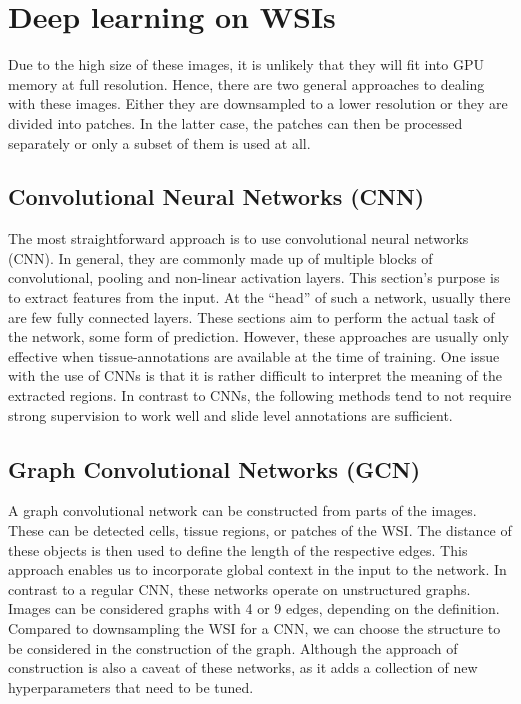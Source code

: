\section{Deep learning on WSIs}

Due to the high size of these images, it is unlikely that they will fit into GPU memory at full resolution. Hence, there are two general approaches to dealing with these images. 
Either they are downsampled to a lower resolution or they are divided into patches. In the latter case, the patches can then be processed separately or only a subset of them is used at all.

\subsection{Convolutional Neural Networks (CNN)}

The most straightforward approach is to use convolutional neural networks (CNN). In general, they are commonly made up of multiple blocks of convolutional, pooling and non-linear activation layers. This section's purpose is to extract features from the input. At the “head” of such a network, usually there are few fully connected layers. These sections aim to perform the actual task of the network, some form of prediction. However, these approaches are usually only effective when tissue-annotations are available at the time of training. One issue with the use of CNNs is that it is rather difficult to interpret the meaning of the extracted regions. \cite{Lipkova2022Artificial}
In contrast to CNNs, the following methods tend to not require strong supervision to work well and slide level annotations are sufficient. 

\subsection{Graph Convolutional Networks (GCN)}

A graph convolutional network can be constructed from parts of the images. These can be detected cells, tissue regions, or patches of the WSI. The distance of these objects is then used to define the length of the respective edges. \cite{Chen2022Pathomic, AhmedtAristizabal2022survey, Chen2021Whole}
This approach enables us to incorporate global context in the input to the network. In contrast to a regular CNN, these networks operate on unstructured graphs. 
\cite{Lipkova2022Artificial} Images can be considered graphs with 4 or 9 edges, depending on the definition.
Compared to downsampling the WSI for a CNN, we can choose the structure to be considered in the construction of the graph. Although the approach of construction is also a caveat of these networks, as it adds a collection of new hyperparameters that need to be tuned. 

